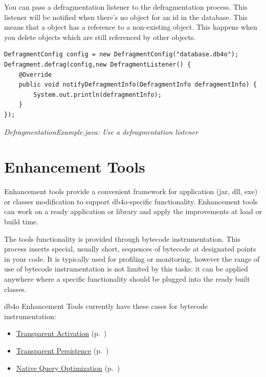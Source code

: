 You can pass a defragmentation listener to the defragmentation process. This listener will be notified when there's no object for an id in the database. This means that a object has a reference to a non-existing object. This happens when you delete objects which are still referenced by other objects.

\begin{lstlisting}
DefragmentConfig config = new DefragmentConfig("database.db4o");
Defragment.defrag(config,new DefragmentListener() {
    @Override
    public void notifyDefragmentInfo(DefragmentInfo defragmentInfo) {
        System.out.println(defragmentInfo);
    }
});
\end{lstlisting}

{\small\itshape DefragmentationExample.java: Use a defragmentation listener\par}
\medskip

\section{Enhancement Tools}
\label{ref:advanced-topics-enhancement-tools}

Enhancement tools provide a convenient framework for application (jar, dll, exe) or classes modification to support db4o-specific functionality. Enhancement tools can work on a ready application or library and apply the improvements at load or build time.

The tools functionality is provided through bytecode instrumentation. This process inserts special, usually short, sequences of bytecode at designated points in your code. It is typically used for profiling or monitoring, however the range of use of bytecode instrumentation is not limited by this tasks: it can be applied anywhere where a specific functionality should be plugged into the ready built classes.

db4o Enhancement Tools currently have these cases for bytecode instrumentation:

\begin{itemize}
\item \hyperref[ref:basics-activation-concept-transparent-activation-framework]{Transparent Activation} (p.~\pageref{ref:basics-activation-concept-transparent-activation-framework})
\item \hyperref[ref:basics-update-concept-transparent-persistence]{Transparent Persistence} (p.~\pageref{ref:basics-update-concept-transparent-persistence})
\item \hyperref[ref:basics-querying-native-queries-native-query-optimization]{Native Query Optimization} (p.~\pageref{ref:basics-querying-native-queries-native-query-optimization})
\end{itemize}

